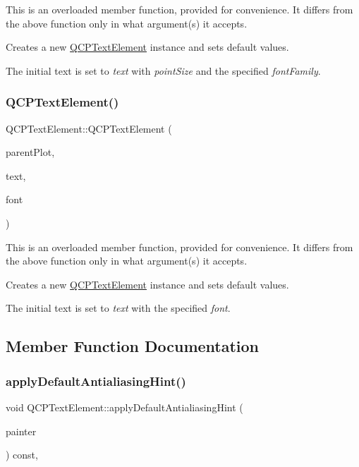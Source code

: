 This is an overloaded member function, provided for convenience. It differs from the above function only in what argument(s) it accepts.

Creates a new \mbox{\hyperlink{class_q_c_p_text_element}{Q\+C\+P\+Text\+Element}} instance and sets default values.

The initial text is set to {\itshape text} with {\itshape point\+Size} and the specified {\itshape font\+Family}. \mbox{\label{class_q_c_p_text_element_a00b75787b77b39bbd083813c2a7b2520}} 
\subsubsection{\texorpdfstring{QCPTextElement()}{QCPTextElement()}\hspace{0.1cm}{\footnotesize\ttfamily [5/5]}}
{\footnotesize\ttfamily Q\+C\+P\+Text\+Element\+::\+Q\+C\+P\+Text\+Element (\begin{DoxyParamCaption}\item[{\mbox{\hyperlink{class_q_custom_plot}{Q\+Custom\+Plot}} $\ast$}]{parent\+Plot,  }\item[{const Q\+String \&}]{text,  }\item[{const Q\+Font \&}]{font }\end{DoxyParamCaption})}

This is an overloaded member function, provided for convenience. It differs from the above function only in what argument(s) it accepts.

Creates a new \mbox{\hyperlink{class_q_c_p_text_element}{Q\+C\+P\+Text\+Element}} instance and sets default values.

The initial text is set to {\itshape text} with the specified {\itshape font}. 

\subsection{Member Function Documentation}
\mbox{\label{class_q_c_p_text_element_a91f2e4b4a639d9079e89a0030c7ed352}} 
\subsubsection{\texorpdfstring{applyDefaultAntialiasingHint()}{applyDefaultAntialiasingHint()}}
{\footnotesize\ttfamily void Q\+C\+P\+Text\+Element\+::apply\+Default\+Antialiasing\+Hint (\begin{DoxyParamCaption}\item[{\mbox{\hyperlink{class_q_c_p_painter}{Q\+C\+P\+Painter}} $\ast$}]{painter }\end{DoxyParamCaption}) const\hspace{0.3cm}{\ttfamily [protected]}, {\ttfamily [virtual]}}



